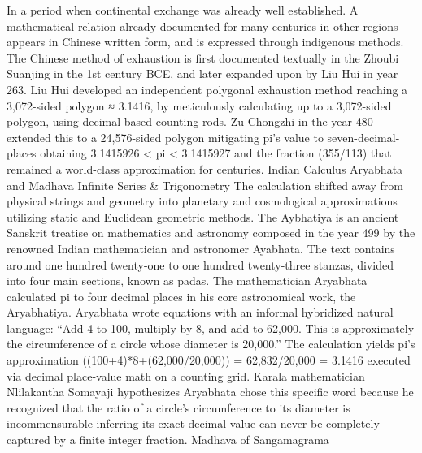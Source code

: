 {In a period when continental exchange was already well established. A mathematical relation already documented for many centuries in other regions appears in Chinese written form, and is expressed through indigenous methods. The Chinese method of exhaustion is first documented textually in the Zhoubi Suanjing in the 1st century BCE, and later expanded upon by Liu Hui in year 263. Liu Hui developed an independent polygonal exhaustion method reaching a 3,072-sided polygon ≈ 3.1416, by meticulously calculating up to a 3,072-sided polygon, using decimal-based counting rods. Zu Chongzhi in the year 480 extended this to a 24,576-sided polygon mitigating pi’s value to seven-decimal-places obtaining 3.1415926 < pi < 3.1415927 and the fraction (355/113) that remained a world-class approximation for centuries. 
Indian Calculus Aryabhata and Madhava
Infinite Series & Trigonometry
The calculation shifted away from physical strings and geometry into planetary and cosmological approximations utilizing static and Euclidean geometric methods. The Aybhatiya is an ancient Sanskrit treatise on mathematics and astronomy composed in the year 499 by the renowned Indian mathematician and astronomer Ayabhata. The text contains around one hundred twenty-one to one hundred twenty-three stanzas, divided into four main sections, known as padas. The mathematician Aryabhata calculated pi to four decimal places in his core astronomical work, the Aryabhatiya. Aryabhata wrote equations with an informal hybridized natural language: 
“Add 4 to 100, multiply by 8, and add to 62,000. This is approximately the circumference of a circle whose diameter is 20,000.”
The calculation yields pi’s approximation
((100+4)*8+({62,000}/{20,000})) = {62,832}/{20,000} = 3.1416
executed via decimal place-value math on a counting grid.
Karala mathematician Nlilakantha Somayaji hypothesizes Aryabhata chose this specific word because he recognized that the ratio of a circle’s circumference to its diameter is incommensurable inferring its exact decimal value can never be completely captured by a finite integer fraction. 
Madhava of Sangamagrama
}

